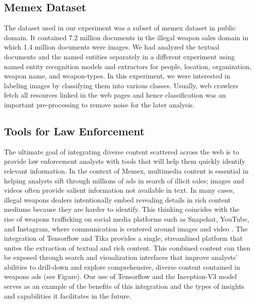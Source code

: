 \subsection{Memex Dataset} \label{sec:memex-dataset}
The dataset used in our experiment was a subset of memex dataset in public domain. It contained 7.2 million documents in the illegal weapon sales domain in which 1.4 million documents were images. We had analyzed the textual documents and the named entities separately in a different experiment using named entity recognition models and extractors for people, location, organization, weapon name, and weapon-types. In this experiment, we were interested in labeling images by classifying them into various classes. Usually, web crawlers fetch all resources linked in the web pages and hence classification was an important pre-processing to remove noise for the later analysis.

\subsection{Tools for Law Enforcement} \label{sec:memex-tools}
The ultimate goal of integrating diverse content scattered across the web is to provide law enforcement analysts with tools that will help them quickly identify relevant information. In the context of Memex, multimedia content is essential in helping analysts sift through millions of ads in search of illicit sales; images and videos often provide salient information not available in text. In many cases, illegal weapons dealers intentionally embed revealing details in rich content mediums because they are harder to identify. This thinking coincides with the rise of weapons trafficking on social media platforms such as Snapchat, YouTube, and Instagram, where communication is centered around images and video \cite{socialmedia}. The integration of Tensorflow and Tika provides a single, streamlined platform that unites the extraction of textual and rich content. This combined content can then be exposed through search and visualization interfaces that improve analysts' abilities to drill-down and explore comprehensive, diverse content contained in weapons ads (see Figure). Our use of Tensorflow and the Inception-V3 model serves as an example of the benefits of this integration and the types of insights and capabilities it facilitates in the future. 